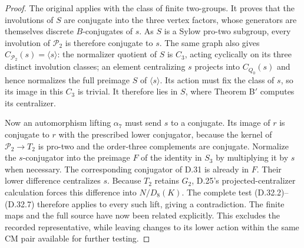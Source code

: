 \begin{proof}
The original \cite[\S2, Theorem A$'$ and Theorem
B$'$]{A_HerfortRibes1985} applies with the class of
finite two-groups. It proves that the involutions
of $S$ are conjugate into the three vertex factors,
whose generators are themselves discrete
$B$-conjugates of $s$. As $S$ is a Sylow pro-two
subgroup, every involution of $\mathcal P_2$ is
therefore conjugate to $s$. The same graph also
gives $C_{\mathcal P_2}(s)=\langle s\rangle$:
the normalizer quotient of $S$ is $C_3$, acting
cyclically on its three distinct involution classes;
an element centralizing $s$ projects into
$C_{Q_0}(s)$ and hence normalizes the full preimage
$S$ of $\langle s\rangle$. Its action must fix the
class of $s$, so its image in this $C_3$ is trivial.
It therefore lies in $S$, where
Theorem B$'$ computes its centralizer.

Now an automorphism lifting $\alpha_7$ must send
$s$ to a conjugate. Its image of $r$ is conjugate
to $r$ with the prescribed lower conjugator,
because the kernel of $\mathcal P_2\to T_2$ is
pro-two and the order-three complements are
conjugate. Normalize the $s$-conjugator into the
preimage $F$ of the identity in $S_3$ by multiplying
it by $s$ when necessary. The corresponding
conjugator of D.31 is already in $F$. Their lower
difference centralizes $s$. Because $T_2$ retains
$G_2$, D.25's projected-centralizer calculation
forces this difference into $N/D_8(K)$. The
complete test (D.32.2)--(D.32.7) therefore applies
to every such lift, giving a contradiction.
The finite maps and the full source have now been
related explicitly. This excludes the recorded
representative, while leaving changes to its
lower action within the same CM pair available
for further testing.
\end{proof}

